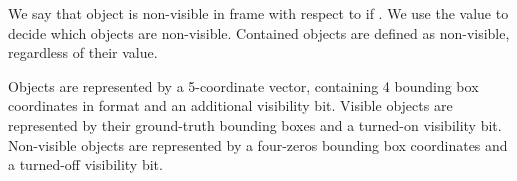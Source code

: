 \documentclass[]{llncs}
\begin{document}
We say that object  is non-visible in frame  with respect to  if . We use the value  to decide which objects are non-visible. Contained objects are defined as non-visible, regardless of their  value. 

Objects are represented by a 5-coordinate vector, containing 4 bounding box coordinates in  format and an additional visibility bit. Visible objects are represented by their ground-truth bounding boxes and a turned-on visibility bit. Non-visible objects are represented by a four-zeros bounding box coordinates and a turned-off visibility bit.
%
 
\end{document}
